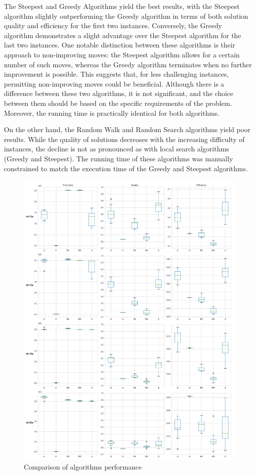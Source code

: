 The Steepest and Greedy Algorithms yield the best results,
with the Steepest algorithm slightly outperforming the Greedy algorithm in terms of both solution quality and efficiency for the first two instances.
Conversely, the Greedy algorithm demonstrates a slight advantage over the Steepest algorithm for the last two instances.
One notable distinction between these algorithms is their approach to non-improving moves: the Steepest algorithm allows for a certain number of such moves,
whereas the Greedy algorithm terminates when no further improvement is possible.
This suggests that, for less challenging instances, permitting non-improving moves could be beneficial.
Although there is a difference between these two algorithms, it is not significant,
and the choice between them should be based on the specific requirements of the problem.
Moreover, the running time is practically identical for both algorithms.

On the other hand, the Random Walk and Random Search algorithms yield poor results.
While the quality of solutions decreases with the increasing difficulty of instances,
the decline is not as pronounced as with local search algorithms (Greedy and Steepest).
The running time of these algorithms was manually constrained to match the execution time of the Greedy and Steepest algorithms.


\begin{figure}[H]
    \centering
    \includegraphics[width=1.0\textwidth]{pics/time_quality_efficiency_box_plots}
    \caption{Comparison of algorithms performance}
    \label{fig:1}
\end{figure}

